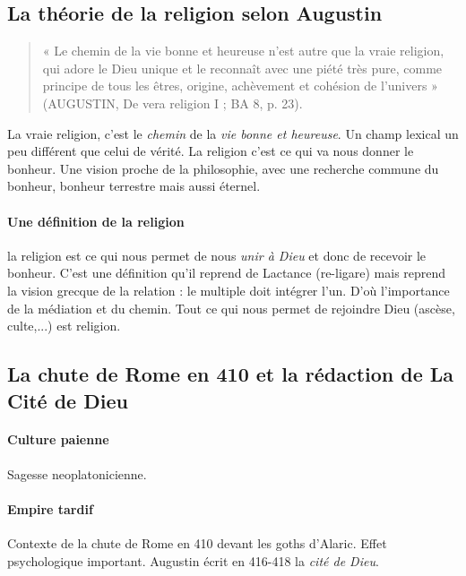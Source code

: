 \label{Def:Religio}
\subsection{La théorie de la religion selon Augustin}




\begin{quote}
    « Le chemin de la vie bonne et heureuse n’est autre que la vraie religion, qui adore le Dieu unique et le reconnaît avec une piété très pure, comme principe de tous les êtres, origine, achèvement et cohésion de l’univers » (AUGUSTIN, De vera religion I ; BA 8, p. 23). 
\end{quote}

La vraie religion, c'est le \textit{chemin} de la \textit{vie bonne et heureuse}. Un champ lexical un peu différent que celui de vérité. La religion c'est ce qui va nous donner le bonheur. 
    Une vision proche de la philosophie, avec une recherche commune du bonheur, bonheur terrestre mais aussi éternel.
    
    \paragraph{Une définition de la religion}
    la religion est ce qui nous permet de nous \textit{unir à Dieu} et donc de recevoir le bonheur. C'est une définition qu'il reprend de Lactance (re-ligare) mais reprend la vision grecque de la relation : le multiple doit intégrer l'un.  D'où l'importance de la médiation et du chemin. Tout ce qui nous permet de rejoindre Dieu (ascèse, culte,...) est religion. 
    
    
 





\subsection{La chute de Rome en 410 et la rédaction de La Cité de Dieu}
\paragraph{Culture paienne}
Sagesse neoplatonicienne. 

\paragraph{Empire tardif} Contexte de la chute de Rome en 410 devant les goths d'Alaric. Effet psychologique important. Augustin écrit en 416-418 la \textit{cité de Dieu}.

